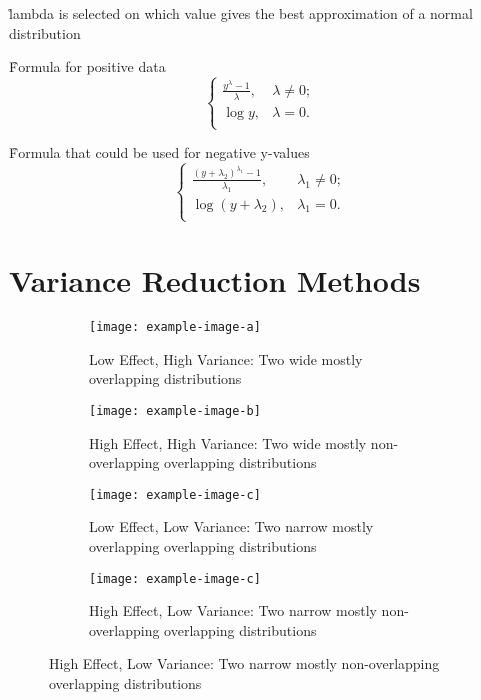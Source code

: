 \r{lambda is selected on which value gives the best approximation of a normal distribution}


\r{Formula for positive data}
\begin{equation}
	\begin{cases} 
		\frac
		{y^\lambda - 1}
		{\lambda},  & \lambda \neq 0; \\
	    \log y, & \lambda = 0. \\
	\end{cases}
\end{equation}



\r{Formula that could be used for negative y-values}
\begin{equation}
	\begin{cases} 
		\frac
		{({{y + \lambda_2}})^{\lambda_1} - 1}
		{\lambda_1},  & {\lambda_1} \neq 0; \\
		\log ({y+{\lambda_2}}), & {\lambda_1} = 0. \\
	\end{cases}
\end{equation}



\section{Variance Reduction Methods}


{}
\begin{figure}
	\begin{subfigure}{6cm}
		\centering\texttt{[image: example-image-a]}
		\caption{Low Effect, High Variance: Two wide mostly overlapping distributions}
	\end{subfigure}
	\begin{subfigure}{6cm}
		\centering\texttt{[image: example-image-b]}
		\caption{High Effect, High Variance: Two wide mostly non-overlapping overlapping distributions}
	\end{subfigure}
	
	\begin{subfigure}{6cm}
		\centering\texttt{[image: example-image-c]}
		\caption{Low Effect, Low Variance: Two narrow mostly overlapping overlapping distributions}
	\end{subfigure}
	\begin{subfigure}{6cm}
		\centering\texttt{[image: example-image-c]}
		\caption{High Effect, Low Variance: Two narrow mostly non-overlapping overlapping distributions}
	\end{subfigure}
\end{figure}

